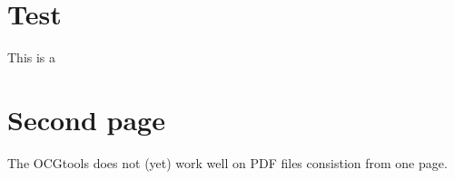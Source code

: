 \documentclass{article}
\begin{document}
\section{Test}
This is a 

\newpage
\section{Second page}
The OCGtools does not (yet) work well on PDF files consistion from one page.
\end{document}
